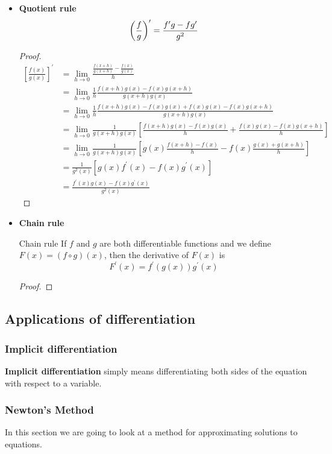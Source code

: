 \begin{itemize}
\item \textbf{Quotient rule}
\[ \left(\frac{f}{g}\right)^\prime = \frac{f^\prime g - fg^\prime}{g^2} \] 

\begin{proof}
\begin{align*}
\left[\frac{f(x)}{g(x)}\right]^\prime &= \lim_{h \to 0} \frac{\frac{f(x+h)}{g(x+h)} - \frac{f(x)}{g(x)}}{h}\\
&= \lim_{h \to 0} \frac{1}{h} \frac{f(x+h) g(x) - f(x) g(x+h)}{g(x+h) g(x)}\\
&= \lim_{h \to 0} \frac{1}{h} \frac{f(x+h) g(x) - f(x) g(x) + f(x) g(x) - f(x) g(x+h)}{g(x+h) g(x)}\\
&= \lim_{h \to 0} \frac{1}{g(x+h) g(x)} \left[ \frac{f(x+h)g(x) - f(x)g(x)}{h} + \frac{f(x)g(x) - f(x)g(x+h)}{h} \right] \\
&= \lim_{h \to 0} \frac{1}{g(x+h) g(x)} \left[ g(x)\frac{f(x+h) - f(x)}{h} - f(x)\frac{g(x) + g(x+h)}{h} \right] \\
&= \frac{1}{g^2(x)} [g(x) f^\prime(x) - f(x) g^\prime(x)] \\
&= \frac{f^\prime(x) g(x) - f(x) g^\prime(x)}{g^2(x)}
\end{align*}
\end{proof}

\item \textbf{Chain rule}
\begin{thrm}{Chain rule}{} 
If $f$ and $g$ are both differentiable functions and we define $F(x) = (f \circ g)(x)$, then the derivative of $F(x)$ is
\begin{equation}
F^\prime (x) = f^\prime(g(x)) g^\prime(x) 
\end{equation} 
\end{thrm}
\begin{proof}

\end{proof}
\end{itemize}

\subsection{Applications of differentiation}
\subsubsection{Implicit differentiation}
\textbf{Implicit differentiation} simply means differentiating both sides of the equation with respect to a variable.

\subsubsection{Newton's Method}
In this section we are going to look at a method for approximating solutions to equations.

